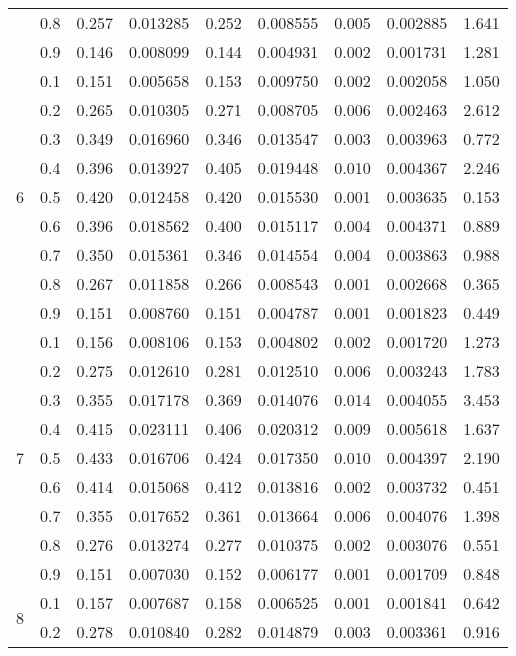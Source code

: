 \begin{longtable}{ | c | c || c | c | c | c | c | c | c | }
 & 0.8 & 0.257 & 0.013285 & 0.252 & 0.008555 & 0.005 & 0.002885 & 1.641 \\
 & 0.9 & 0.146 & 0.008099 & 0.144 & 0.004931 & 0.002 & 0.001731 & 1.281 \\
 \hline
\multirow{9}{*}{6} & 0.1 & 0.151 & 0.005658 & 0.153 & 0.009750 & 0.002 & 0.002058 & 1.050 \\
 & 0.2 & 0.265 & 0.010305 & 0.271 & 0.008705 & 0.006 & 0.002463 & 2.612 \\
 & 0.3 & 0.349 & 0.016960 & 0.346 & 0.013547 & 0.003 & 0.003963 & 0.772 \\
 & 0.4 & 0.396 & 0.013927 & 0.405 & 0.019448 & 0.010 & 0.004367 & 2.246 \\
 & 0.5 & 0.420 & 0.012458 & 0.420 & 0.015530 & 0.001 & 0.003635 & 0.153 \\
 & 0.6 & 0.396 & 0.018562 & 0.400 & 0.015117 & 0.004 & 0.004371 & 0.889 \\
 & 0.7 & 0.350 & 0.015361 & 0.346 & 0.014554 & 0.004 & 0.003863 & 0.988 \\
 & 0.8 & 0.267 & 0.011858 & 0.266 & 0.008543 & 0.001 & 0.002668 & 0.365 \\
 & 0.9 & 0.151 & 0.008760 & 0.151 & 0.004787 & 0.001 & 0.001823 & 0.449 \\
 \hline
\multirow{9}{*}{7} & 0.1 & 0.156 & 0.008106 & 0.153 & 0.004802 & 0.002 & 0.001720 & 1.273 \\
 & 0.2 & 0.275 & 0.012610 & 0.281 & 0.012510 & 0.006 & 0.003243 & 1.783 \\
 & 0.3 & 0.355 & 0.017178 & 0.369 & 0.014076 & 0.014 & 0.004055 & 3.453 \\
 & 0.4 & 0.415 & 0.023111 & 0.406 & 0.020312 & 0.009 & 0.005618 & 1.637 \\
 & 0.5 & 0.433 & 0.016706 & 0.424 & 0.017350 & 0.010 & 0.004397 & 2.190 \\
 & 0.6 & 0.414 & 0.015068 & 0.412 & 0.013816 & 0.002 & 0.003732 & 0.451 \\
 & 0.7 & 0.355 & 0.017652 & 0.361 & 0.013664 & 0.006 & 0.004076 & 1.398 \\
 & 0.8 & 0.276 & 0.013274 & 0.277 & 0.010375 & 0.002 & 0.003076 & 0.551 \\
 & 0.9 & 0.151 & 0.007030 & 0.152 & 0.006177 & 0.001 & 0.001709 & 0.848 \\
 \hline
\multirow{9}{*}{8} & 0.1 & 0.157 & 0.007687 & 0.158 & 0.006525 & 0.001 & 0.001841 & 0.642 \\
 & 0.2 & 0.278 & 0.010840 & 0.282 & 0.014879 & 0.003 & 0.003361 & 0.916 \\

\end{longtable}
